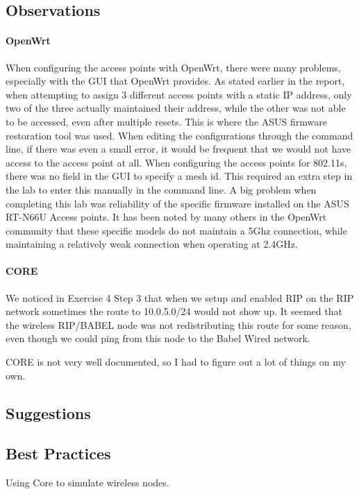 \documentclass[main.tex]{subfiles}
\begin{document}
\subsection{Observations}
\paragraph{OpenWrt}
\hfill \break
\noindent When configuring the access points with OpenWrt, there were many problems, especially with the GUI that OpenWrt provides. As stated earlier in the report, when attempting to assign 3 different access points with a static IP address, only two of the three actually maintained their address, while the other was not able to be accessed, even after multiple resets. This is where the ASUS firmware restoration tool was used. When editing the configurations through the command line, if there was even a small error, it would be frequent that we would not have access to the access point at all. When configuring the access points for 802.11s, there was no field in the GUI to specify a mesh id. This required an extra step in the lab to enter this manually in the command line. A big problem when completing this lab was reliability of the specific firmware installed on the ASUS RT-N66U Access points. It has been noted by many others in the OpenWrt community that these specific models do not maintain a 5Ghz connection, while maintaining a relatively weak connection when operating at 2.4GHz. 



\paragraph{CORE}
\hfill \break
\noindent We noticed in Exercise 4 Step 3 that when we setup and enabled RIP on the RIP network sometimes the route to 10.0.5.0/24 would not show up.  It seemed that the wireless RIP/BABEL node was not redistributing this route for some reason, even though we could ping from this node to the Babel Wired network.

\noindent CORE is not very well documented, so I had to figure out a lot of things on my own.

\subsection{Suggestions}

\subsection{Best Practices}
Using Core to simulate wireless nodes.
\end{document}

